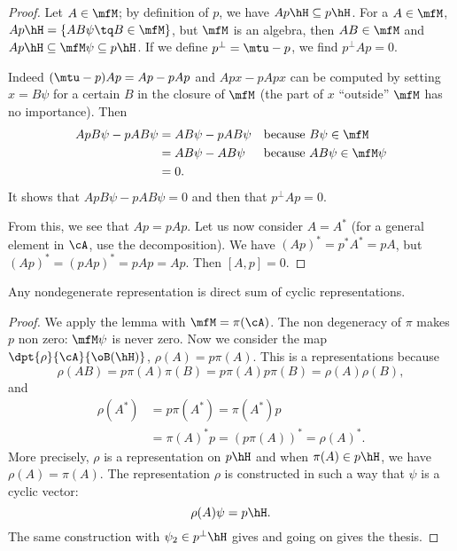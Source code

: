 \begin{proof}
Let $A\in\mfM$; by definition of $p$, we have $Ap\hH\subseteq p\hH$. For a $A\in\mfM$, $Ap\hH=\{ AB\psi\tq B\in\mfM \}$, but $\mfM$ is an algebra, then $AB\in\mfM$ and $Ap\hH\subseteq\mfM\psi\subseteq p\hH$. If we define $p^{\perp}=\mtu-p$, we find $p^{\perp}Ap=0$.

 Indeed $(\mtu-p)Ap=Ap-pAp$ and $Apx-pApx$ can be computed by setting $x=B\psi$ for a certain $B$ in the closure of $\mfM$ (the part of $x$ ``outside'' $\mfM$ has no importance). Then
\begin{equation}
\begin{aligned}
   ApB \psi-pAB\psi&=AB\psi-pAB\psi  &&\textrm{because $B\psi\in\mfM$}\\
        &=AB\psi-AB\psi  &&\textrm{because $AB\psi\in\mfM\psi$}\\
        &=0.
\end{aligned}
\end{equation}
It shows that $ApB\psi-pAB\psi=0$ and then that $p^{\perp}Ap=0$. 

From this, we see that $Ap=pAp$. Let us now consider $A=A^*$ (for a general element in $\cA$, use the decomposition). We have $(Ap)^*=p^*A^*=pA$, but $(Ap)^*=(pAp)^*=pAp=Ap$. Then $[A,p]=0$.


\end{proof}


\begin{proposition}
Any nondegenerate representation is direct sum of cyclic representations.
\end{proposition}

\begin{proof}
We apply the lemma with $\mfM=\pi(\cA)$. The non degeneracy of $\pi$ makes $p$ non zero: $\mfM\psi$ is never zero. Now we consider the map $\dpt{\rho}{\cA}{\oB(\hH)}$, $\rho(A)=p \pi(A)$. This is a representations because
\begin{equation}
    \rho(AB)=p\pi(A)\pi(B)
        =p\pi(A)p\pi(B)
        =\rho(A)\rho(B),
\end{equation}
and
\begin{equation}
\begin{split}
\rho(A^*)&=p\pi(A^*)=\pi(A^*)p\\
        &=\pi(A)^*p=(p\pi(A))^*=\rho(A)^*.
\end{split}
\end{equation}
More precisely, $\rho$ is a representation on $p\hH$ and when $\pi(A)\in p\hH$, we have $\rho(A)=\pi(A)$. The representation $\rho$ is constructed in such a way that $\psi$ is a cyclic vector:
\[ 
  \rho(A)\psi=p\hH.
\]
The same construction with $\psi_2\in p^{\perp}\hH$ gives and going on gives the thesis.
\end{proof}



